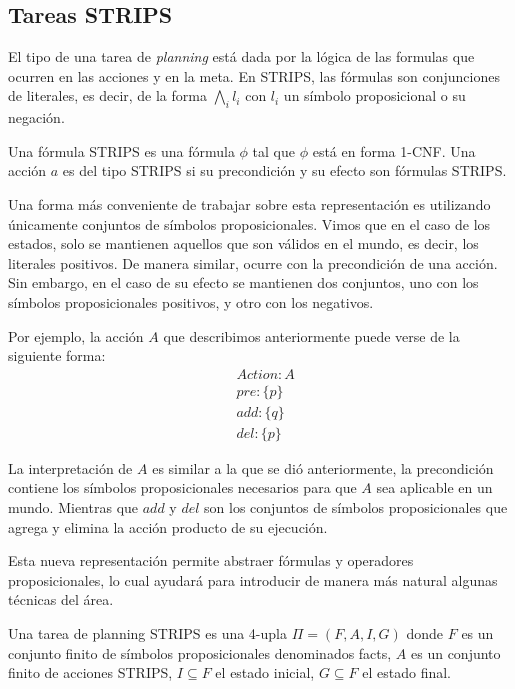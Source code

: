 \subsection{Tareas STRIPS}

El tipo de una tarea de \emph{planning} está dada por la lógica de las formulas
que ocurren en las acciones y en la meta. En STRIPS, las fórmulas son
conjunciones de literales, es decir, de la forma $\bigwedge_i l_i$ con $l_i$
un símbolo proposicional o su negación.

\begin{mydef}
    Una fórmula STRIPS es una fórmula $\phi$ tal que $\phi$ está en forma 1-CNF.
    Una acción $a$ es del tipo STRIPS si su precondición y su efecto son fórmulas
    STRIPS.
\end{mydef}

Una forma más conveniente de trabajar sobre esta representación es utilizando
únicamente conjuntos de símbolos proposicionales. Vimos que en el caso de los
estados, solo se mantienen aquellos que son válidos en el mundo, es decir, los
literales positivos. De manera similar, ocurre con la precondición de una
acción. Sin embargo, en el caso de su efecto se mantienen dos conjuntos, uno
con los símbolos proposicionales positivos, y otro con los negativos.

Por ejemplo, la acción $A$ que describimos anteriormente puede verse
de la siguiente forma:
\begin{align*}
    & Action : A \\
    & pre : \{ p \}\\
    & add : \{ q \}\\
    & del : \{ p \}
\end{align*}

La interpretación de $A$ es similar a la que se dió anteriormente, la
precondición contiene los símbolos proposicionales necesarios para que $A$ sea
aplicable en un mundo. Mientras que $add$ y $del$ son los conjuntos de símbolos
proposicionales que agrega y elimina la acción producto de su ejecución.

Esta nueva representación permite abstraer fórmulas y operadores
proposicionales, lo cual ayudará para introducir de manera más natural algunas
técnicas del área.

\begin{mydef}
    Una tarea de planning STRIPS es una 4-upla $\Pi = (F, A, I, G)$ donde $F$ es
    un conjunto finito de símbolos proposicionales denominados facts, $A$ es un
    conjunto finito de acciones STRIPS, $I \subseteq F$ el estado inicial, $G
    \subseteq F$ el estado final.
\end{mydef}

